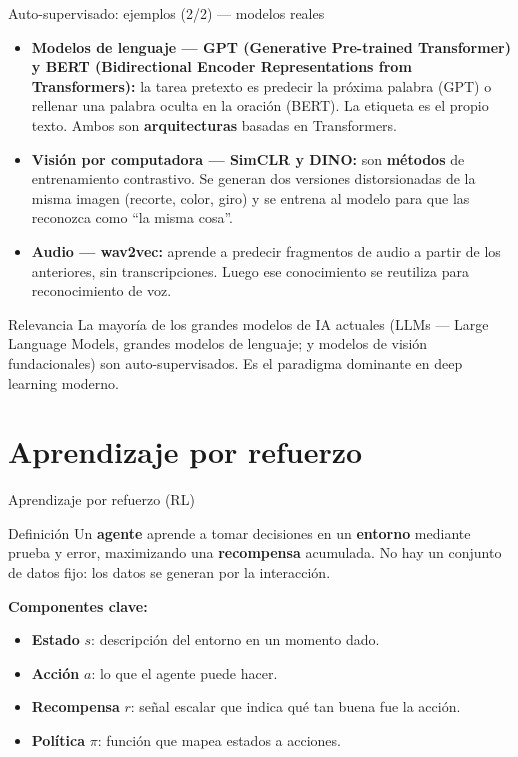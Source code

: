\documentclass[aspectratio=169]{beamer}
\begin{document}
\begin{frame}{Auto-supervisado: ejemplos (2/2) --- modelos reales}
  \small
  \begin{itemize}
    \item \textbf{Modelos de lenguaje --- GPT (Generative Pre-trained Transformer) y BERT (Bidirectional Encoder Representations from Transformers):} la tarea pretexto es predecir la próxima palabra (GPT) o rellenar una palabra oculta en la oración (BERT). La etiqueta es el propio texto. Ambos son \textbf{arquitecturas} basadas en Transformers.
    \item \textbf{Visión por computadora --- SimCLR y DINO:} son \textbf{métodos} de entrenamiento contrastivo. Se generan dos versiones distorsionadas de la misma imagen (recorte, color, giro) y se entrena al modelo para que las reconozca como ``la misma cosa''.
    \item \textbf{Audio --- wav2vec:} aprende a predecir fragmentos de audio a partir de los anteriores, sin transcripciones. Luego ese conocimiento se reutiliza para reconocimiento de voz.
  \end{itemize}
  \begin{alertblock}{Relevancia}
    La mayoría de los grandes modelos de IA actuales (LLMs --- Large Language Models, grandes modelos de lenguaje; y modelos de visión fundacionales) son auto-supervisados. Es el paradigma dominante en deep learning moderno.
  \end{alertblock}
\end{frame}

\section{Aprendizaje por refuerzo}

\begin{frame}{Aprendizaje por refuerzo (RL)}
  \begin{block}{Definición}
    Un \textbf{agente} aprende a tomar decisiones en un \textbf{entorno} mediante prueba y error, maximizando una \textbf{recompensa} acumulada. No hay un conjunto de datos fijo: los datos se generan por la interacción.
  \end{block}
  \bigskip
  \textbf{Componentes clave:}
  \begin{itemize}
    \item \textbf{Estado} $s$: descripción del entorno en un momento dado.
    \item \textbf{Acción} $a$: lo que el agente puede hacer.
    \item \textbf{Recompensa} $r$: señal escalar que indica qué tan buena fue la acción.
    \item \textbf{Política} $\pi$: función que mapea estados a acciones.
  \end{itemize}
\end{frame}
\end{document}
